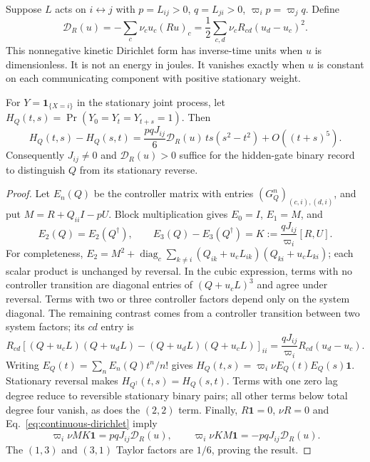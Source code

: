 Suppose $L$ acts on $i\leftrightarrow j$ with
$p=L_{ij}>0$, $q=L_{ji}>0$, $\varpi_i p=\varpi_jq$. Define
\begin{equation}
 \mathcal D_R(u)=-\sum_c\nu_cu_c(Ru)_c
 =\frac12\sum_{c,d}\nu_cR_{cd}(u_d-u_c)^2.
 \label{eq:continuous-dirichlet}
\end{equation}
This nonnegative kinetic Dirichlet form has inverse-time units when $u$ is
dimensionless. It is not an energy in joules. It vanishes exactly when $u$
is constant on each communicating component with positive stationary weight.

\begin{theorem}
\label{thm:continuous-gate}
For $Y=\mathbf1_{\{X=i\}}$ in the stationary joint process, let
$H_Q(t,s)=\Pr(Y_0=Y_t=Y_{t+s}=1)$. Then
\begin{equation}
 H_Q(t,s)-H_Q(s,t)
 =\frac{pqJ_{ij}}6\mathcal D_R(u)\,ts(s^2-t^2)+O((t+s)^5).
 \label{eq:continuous-gate-coefficient}
\end{equation}
Consequently $J_{ij}\ne0$ and $\mathcal D_R(u)>0$ suffice for the hidden-gate
binary record to distinguish $Q$ from its stationary reverse.
\end{theorem}
\begin{proof}
Let $E_n(Q)$ be the controller matrix with entries
$(G_Q^n)_{(c,i),(d,i)}$, and put $M=R+Q_{ii}I-pU$.
Block multiplication gives $E_0=I$, $E_1=M$, and
\begin{equation}
 E_2(Q)=E_2(Q^\dagger),\qquad
 E_3(Q)-E_3(Q^\dagger)=K:=\frac{qJ_{ij}}{\varpi_i}[R,U].
\end{equation}
For completeness, $E_2=M^2+\operatorname{diag}_c
\sum_{k\ne i}(Q_{ik}+u_cL_{ik})(Q_{ki}+u_cL_{ki})$; each scalar product is
unchanged by reversal. In the cubic expression, terms with no controller
transition are diagonal entries of $(Q+u_cL)^3$ and agree under reversal.
Terms with two or three controller factors depend only on the system
diagonal. The remaining contrast comes from a controller transition between
two system factors; its $cd$ entry is
\[
 R_{cd}[(Q+u_cL)(Q+u_dL)-(Q+u_dL)(Q+u_cL)]_{ii}
 =\frac{qJ_{ij}}{\varpi_i}R_{cd}(u_d-u_c).
\]
Writing $E_Q(t)=\sum_n E_n(Q)t^n/n!$ gives
$H_Q(t,s)=\varpi_i\nu E_Q(t)E_Q(s)\mathbf1$.
Stationary reversal makes $H_{Q^\dagger}(t,s)=H_Q(s,t)$.
Terms with one zero lag degree reduce to reversible stationary binary pairs;
all other terms below total degree four vanish, as does the $(2,2)$ term.
Finally, $R\mathbf1=0$, $\nu R=0$ and Eq.~\eqref{eq:continuous-dirichlet}
imply
\[
 \varpi_i\nu MK\mathbf1=pqJ_{ij}\mathcal D_R(u),\qquad
 \varpi_i\nu KM\mathbf1=-pqJ_{ij}\mathcal D_R(u).
\]
The $(1,3)$ and $(3,1)$ Taylor factors are $1/6$, proving the result.
\end{proof}

